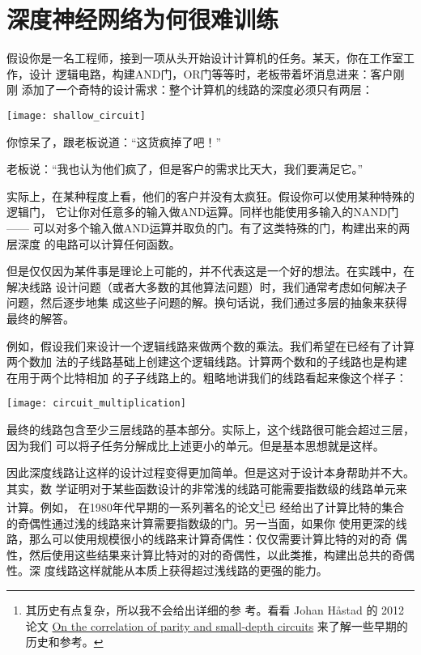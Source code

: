 
\chapter{深度神经网络为何很难训练}
\label{ch:WhyHardToTrain}

假设你是一名工程师，接到一项从头开始设计计算机的任务。某天，你在工作室工作，设计
逻辑电路，构建{\serif AND}门，{\serif OR}门等等时，老板带着坏消息进来：客户刚刚
添加了一个奇特的设计需求：整个计算机的线路的深度必须只有两层：
\begin{center}
  \texttt{[image: shallow\_circuit]}
\end{center}

你惊呆了，跟老板说道：“这货疯掉了吧！”
 
老板说：“我也认为他们疯了，但是客户的需求比天大，我们要满足它。”
 
实际上，在某种程度上看，他们的客户并没有太疯狂。假设你可以使用某种特殊的逻辑门，
它让你对任意多的输入做{\serif AND}运算。同样也能使用多输入的{\serif NAND}门 ——
可以对多个输入做{\serif AND}运算并取负的门。有了这类特殊的门，构建出来的两层深度
的电路可以计算任何函数。

但是仅仅因为某件事是理论上可能的，并不代表这是一个好的想法。在实践中，在解决线路
设计问题（或者大多数的其他算法问题）时，我们通常考虑如何解决子问题，然后逐步地集
成这些子问题的解。换句话说，我们通过多层的抽象来获得最终的解答。

例如，假设我们来设计一个逻辑线路来做两个数的乘法。我们希望在已经有了计算两个数加
法的子线路基础上创建这个逻辑线路。计算两个数和的子线路也是构建在用于两个比特相加
的子子线路上的。粗略地讲我们的线路看起来像这个样子：
\begin{center}
  \texttt{[image: circuit\_multiplication]}
\end{center}

最终的线路包含至少三层线路的基本部分。实际上，这个线路很可能会超过三层，因为我们
可以将子任务分解成比上述更小的单元。但是基本思想就是这样。
 
因此深度线路让这样的设计过程变得更加简单。但是这对于设计本身帮助并不大。其实，数
学证明对于某些函数设计的非常浅的线路可能需要指数级的线路单元来计算。例如，
在1980年代早期的一系列著名的论文\footnote{其历史有点复杂，所以我不会给出详细的参
  考。看看 Johan
  Håstad 的 2012 论文 \href{http://eccc.hpi-web.de/report/2012/137/}{On the
    correlation of parity and small-depth circuits} 来了解一些早期的历史和参考。}已
经给出了计算比特的集合的奇偶性通过浅的线路来计算需要指数级的门。另一当面，如果你
使用更深的线路，那么可以使用规模很小的线路来计算奇偶性：仅仅需要计算比特的对的奇
偶性，然后使用这些结果来计算比特对的对的奇偶性，以此类推，构建出总共的奇偶性。深
度线路这样就能从本质上获得超过浅线路的更强的能力。
 
